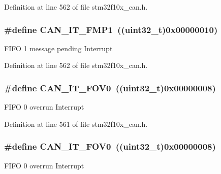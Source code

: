 Definition at line 562 of file stm32f10x\+\_\+can.\+h.

\subsubsection[{\texorpdfstring{C\+A\+N\+\_\+\+I\+T\+\_\+\+F\+M\+P1}{CAN_IT_FMP1}}]{\setlength{\rightskip}{0pt plus 5cm}\#define C\+A\+N\+\_\+\+I\+T\+\_\+\+F\+M\+P1~(({\bf uint32\+\_\+t})0x00000010)}\hypertarget{group___c_a_n__interrupts_gaa0e101053fb203629e0e9a954213e71e}{}\label{group___c_a_n__interrupts_gaa0e101053fb203629e0e9a954213e71e}
F\+I\+FO 1 message pending Interrupt 

Definition at line 562 of file stm32f10x\+\_\+can.\+h.

\subsubsection[{\texorpdfstring{C\+A\+N\+\_\+\+I\+T\+\_\+\+F\+O\+V0}{CAN_IT_FOV0}}]{\setlength{\rightskip}{0pt plus 5cm}\#define C\+A\+N\+\_\+\+I\+T\+\_\+\+F\+O\+V0~(({\bf uint32\+\_\+t})0x00000008)}\hypertarget{group___c_a_n__interrupts_ga066a4317f95669e5b5931c9a759cf248}{}\label{group___c_a_n__interrupts_ga066a4317f95669e5b5931c9a759cf248}
F\+I\+FO 0 overrun Interrupt 

Definition at line 561 of file stm32f10x\+\_\+can.\+h.

\subsubsection[{\texorpdfstring{C\+A\+N\+\_\+\+I\+T\+\_\+\+F\+O\+V0}{CAN_IT_FOV0}}]{\setlength{\rightskip}{0pt plus 5cm}\#define C\+A\+N\+\_\+\+I\+T\+\_\+\+F\+O\+V0~(({\bf uint32\+\_\+t})0x00000008)}\hypertarget{group___c_a_n__interrupts_ga066a4317f95669e5b5931c9a759cf248}{}\label{group___c_a_n__interrupts_ga066a4317f95669e5b5931c9a759cf248}
F\+I\+FO 0 overrun Interrupt 

